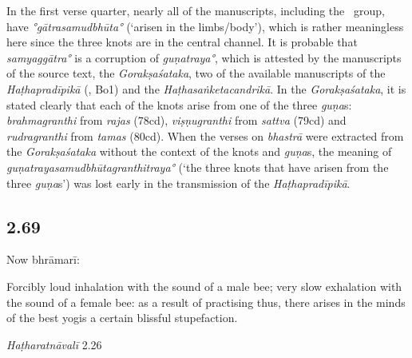 \begin{ekdosis}
\begin{testimonia}[hp02_068]
\end{testimonia}

\begin{philcomm}[hp02_068]
In the first verse quarter, nearly all of the manuscripts, including the \textalpha\ group, have \emph{°gātrasamudbhūta°} (`arisen in the limbs/body'), which is rather meaningless here since the three knots are in the central channel. It is probable that \emph{samyaggātra°} is a corruption of \emph{guṇatraya°}, which is attested by the manuscripts of the source text, the \emph{Gorakṣaśataka}, two of the available manuscripts of the \emph{Haṭhapradīpikā} (, Bo1) and the \emph{Haṭhasaṅketacandrikā}. In the \emph{Gorakṣaśataka}, it is stated clearly that each of the knots arise from one of the three \emph{guṇa}s: \emph{brahmagranthi} from \emph{rajas} (78cd), \emph{viṣṇugranthi} from \emph{sattva} (79cd) and \emph{rudragranthi} from \emph{tamas} (80cd). When the verses on \emph{bhastrā} were extracted from the \emph{Gorakṣaśataka} without the context of the knots and \emph{guṇa}s, the meaning of \emph{guṇa\-traya\-sam\-udbhūta\-granthi\-traya°} (`the three knots that have arisen from the three \emph{guṇa}s') was lost early in the transmission of the \emph{Haṭhapradīpikā}.  
\end{philcomm}

\subsection*{2.69}
\begin{translation}[hp02_069]
Now bhrāmarī:

Forcibly loud inhalation with the sound of a male bee; very slow exhalation with the sound of a female bee: as a result of practising thus, there arises in the minds of the best yogis a certain blissful stupefaction.
\end{translation}

\begin{testimonia}[hp02_069]
\emph{Haṭharatnāvalī} 2.26

\begin{versinnote}
\tl{\var{līlā ]°mūrcchā N,n1,n2,n3,n4,J,T,t1}\\!}
\end{versinnote}



\end{testimonia}
\end{ekdosis}
